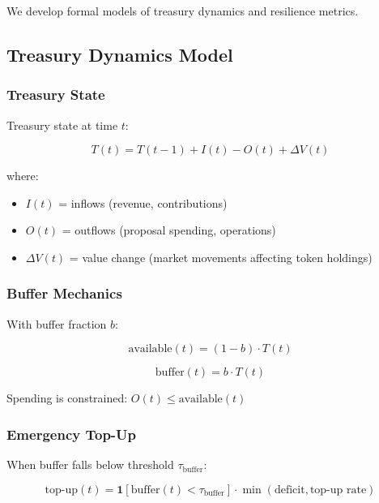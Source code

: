 
We develop formal models of treasury dynamics and resilience metrics.

\subsection{Treasury Dynamics Model}

\subsubsection{Treasury State}

Treasury state at time $t$:

\begin{equation}
T(t) = T(t-1) + I(t) - O(t) + \Delta V(t)
\end{equation}

where:
\begin{itemize}
    \item $I(t)$ = inflows (revenue, contributions)
    \item $O(t)$ = outflows (proposal spending, operations)
    \item $\Delta V(t)$ = value change (market movements affecting token holdings)
\end{itemize}

\subsubsection{Buffer Mechanics}

With buffer fraction $b$:

\begin{equation}
\text{available}(t) = (1 - b) \cdot T(t)
\end{equation}

\begin{equation}
\text{buffer}(t) = b \cdot T(t)
\end{equation}

Spending is constrained: $O(t) \leq \text{available}(t)$

\subsubsection{Emergency Top-Up}

When buffer falls below threshold $\tau_{\text{buffer}}$:

\begin{equation}
\text{top-up}(t) = \mathbf{1}[\text{buffer}(t) < \tau_{\text{buffer}}] \cdot \min(\text{deficit}, \text{top-up rate})
\end{equation}

